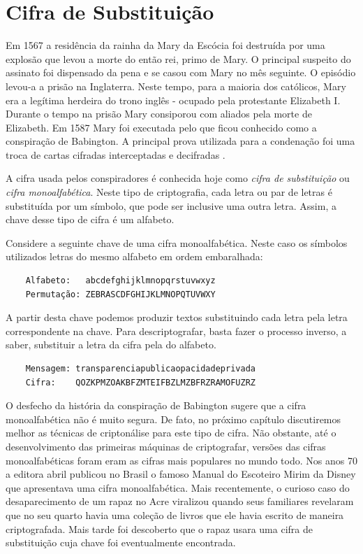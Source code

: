 \section{Cifra de Substituição}
\label{sec:cifra-monoalfabetica}

Em 1567 a residência da rainha da Mary da Escócia foi destruída por uma explosão que levou a morte do então rei, primo de Mary.
O principal suspeito do assinato foi dispensado da pena e se casou com Mary no mês seguinte.
O episódio levou-a a prisão na Inglaterra.
Neste tempo, para a maioria dos católicos, Mary era a legítima herdeira do trono inglês - ocupado pela protestante Elizabeth I.
Durante o tempo na prisão Mary consiporou com aliados pela morte de Elizabeth.
Em 1587 Mary foi executada pelo que ficou conhecido como a conspiração de Babington.
A principal prova utilizada para a condenação foi uma troca de cartas cifradas interceptadas e decifradas \cite{Singh04}.

A cifra usada pelos conspiradores é conhecida hoje como {\em cifra de substituição} ou {\em cifra monoalfabética}.
Neste tipo de criptografia, cada letra ou par de letras é substituída por um símbolo, que pode ser inclusive uma outra letra.
Assim, a chave desse tipo de cifra é um alfabeto.


\begin{example}
  Considere a seguinte chave de uma cifra monoalfabética.
  Neste caso os símbolos utilizados letras do mesmo alfabeto em ordem embaralhada:
  \begin{verbatim}
    Alfabeto:   abcdefghijklmnopqrstuvwxyz
    Permutação: ZEBRASCDFGHIJKLMNOPQTUVWXY
  \end{verbatim}

  A partir desta chave podemos produzir textos substituindo cada letra pela letra correspondente na chave.
  Para descriptografar, basta fazer o processo inverso, a saber, substituir a letra da cifra pela do alfabeto.
  
  \begin{verbatim}
    Mensagem: transparenciapublicaopacidadeprivada
    Cifra:    QOZKPMZOAKBFZMTEIFBZLMZBFRZRAMOFUZRZ
  \end{verbatim}
\end{example}

O desfecho da história da conspiração de Babington sugere que a cifra monoalfabética não é muito segura.
De fato, no próximo capítulo discutiremos melhor as técnicas de criptonálise para este tipo de cifra.
Não obstante, até o desenvolvimento das primeiras máquinas de criptografar, versões das cifras monoalfabéticas foram eram as cifras mais populares no mundo todo.
Nos anos 70 a editora abril publicou no Brasil o famoso Manual do Escoteiro Mirim da Disney que apresentava uma cifra monoalfabética.
Mais recentemente, o curioso caso do desaparecimento de um rapaz no Acre viralizou quando seus familiares revelaram que no seu quarto havia uma coleção de livros que ele havia escrito de maneira criptografada.
Mais tarde foi descoberto que o rapaz usara uma cifra de substituição cuja chave foi eventualmente encontrada.

